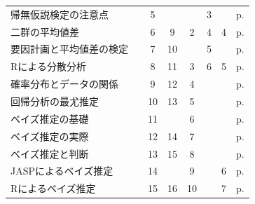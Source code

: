 \begin{table}
\begin{tabular}[t]{lccccccc}
		帰無仮説検定の注意点   &      & 5  &     &       & 3  &    & p.\pageref{m19_NHST2}                \\
		二群の平均値差      &      & 6  & 9   & 2     & 4  & 4  & p.\pageref{m20_ttest}                \\
		要因計画と平均値差の検定 &      & 7  & 10  &       & 5  &    & p.\pageref{m21_anova}                \\
		Rによる分散分析     &      & 8  & 11  & 3     & 6  & 5  & p.\pageref{m22_anovaOnR}             \\
		確率分布とデータの関係  &      & 9  & 12  & 4     &    &    & p.\pageref{m23_likelihood}           \\
		回帰分析の最尤推定    &      & 10 & 13  & 5     &    &    & p.\pageref{m24_maximum_likelihood}   \\
		ベイズ推定の基礎     &      & 11 &     & 6     &    &    & p.\pageref{m25_bayesian}             \\
		ベイズ推定の実際     &      & 12 & 14  & 7     &    &    & p.\pageref{m26_bayesian2}            \\
		ベイズ推定と判断     &      & 13 & 15  & 8     &    &    & p.\pageref{m27_bayesian3}            \\
		JASPによるベイズ推定 &      & 14 &     & 9     &    & 6  & p.\pageref{m28_jasp}                 \\
		Rによるベイズ推定    &      & 15 & 16  & 10    &    & 7  & p.\pageref{m29_brms}                 \\\hline
	\end{tabular}
\end{table}
